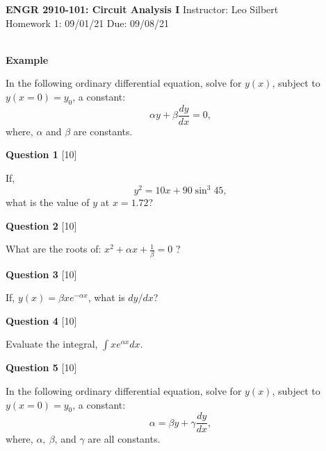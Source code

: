 \documentclass[12pt]{article}
\begin{document}

\begin{center}
\hfil
{\large\bf {ENGR 2910-101: Circuit Analysis I}}
\hfill Instructor: Leo Silbert \\
Homework 1: 09/01/21 \hfill Due: 09/08/21\\
\hrulefill\\
\end{center}




\noindent
{\bf Example}

In the following ordinary differential equation, solve for $y(x)$,  
subject to $y(x=0) = y_{0}$, a constant:  
\[
\alpha y + \beta \frac{d y}{d x} = 0,
\] 
where, $\alpha$ and $\beta$ are constants. 

\vspace{0.1in}
\noindent
{\bf Question 1} [10]

If, 
\[
y^{2} = 10 x + 90 \sin^{3} 45,
\]
what is the value of $y$ at $x=1.72$?

\vspace{0.1in}
\noindent
{\bf Question 2} [10]

What are the roots of: $ x^{2} + \alpha x + \frac{1}{\beta} = 0$ ?

\vspace{0.1in}
\noindent
{\bf Question 3} [10]

If, $y(x) = \beta x e^{- \alpha x}$, what is $dy/dx$? 

\vspace{0.1in}
\noindent
{\bf Question 4} [10]

Evaluate the integral, $\int x e^{\alpha x} dx$.

\vspace{0.1in}
\noindent
{\bf Question 5} [10]

In the following ordinary differential equation, solve for $y(x)$, 
subject to $y(x=0) = y_{0}$, a constant: 
\[
\alpha = \beta y + \gamma \frac{d y}{d x}, 
\]
where, $\alpha,~\beta$, and $\gamma$ are all constants. 
\end{document}
